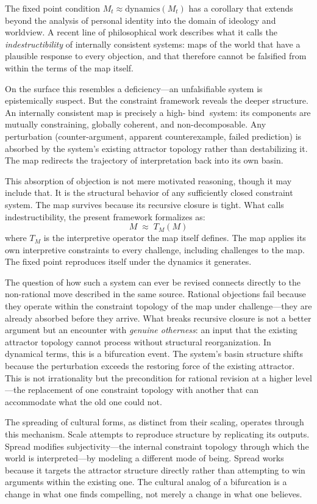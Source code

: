 \documentclass[11pt]{article}
\newcommand{\bind}{\operatorname{bind}}
\begin{document}
The fixed point condition $M_t \approx \mathrm{dynamics}(M_t)$ has a corollary that
extends beyond the analysis of personal identity into the domain of ideology and
worldview. A recent line of philosophical work \citep{rose2023} describes what it calls
the \emph{indestructibility} of internally consistent systems: maps of the world that
have a plausible response to every objection, and that therefore cannot be falsified from
within the terms of the map itself.

On the surface this resembles a deficiency—an unfalsifiable system is epistemically
suspect. But the constraint framework reveals the deeper structure. An internally
consistent map is precisely a high-$\bind$ system: its components are mutually
constraining, globally coherent, and non-decomposable. Any perturbation (counter-argument,
apparent counterexample, failed prediction) is absorbed by the system's existing attractor
topology rather than destabilizing it. The map redirects the trajectory of interpretation
back into its own basin.

This absorption of objection is not mere motivated reasoning, though it may include that.
It is the structural behavior of any sufficiently closed constraint system. The map
survives because its recursive closure is tight. What \citet{rose2023} calls
indestructibility, the present framework formalizes as:
\[
M \;\approx\; T_M(M)
\]
where $T_M$ is the interpretive operator the map itself defines. The map applies its own
interpretive constraints to every challenge, including challenges to the map. The fixed
point reproduces itself under the dynamics it generates.

The question of how such a system can ever be revised connects directly to the
non-rational move described in the same source. Rational objections fail because they
operate within the constraint topology of the map under challenge—they are already
absorbed before they arrive. What breaks recursive closure is not a better argument but
an encounter with \emph{genuine otherness}: an input that the existing attractor topology
cannot process without structural reorganization. In dynamical terms, this is a
bifurcation event. The system's basin structure shifts because the perturbation exceeds
the restoring force of the existing attractor. This is not irrationality but the
precondition for rational revision at a higher level—the replacement of one constraint
topology with another that can accommodate what the old one could not.

The spreading of cultural forms, as distinct from their scaling, operates through this
mechanism. Scale attempts to reproduce structure by replicating its outputs. Spread
modifies subjectivity—the internal constraint topology through which the world is
interpreted—by modeling a different mode of being. Spread works because it targets the
attractor structure directly rather than attempting to win arguments within the existing
one. The cultural analog of a bifurcation is a change in what one finds compelling, not
merely a change in what one believes.
\end{document}
